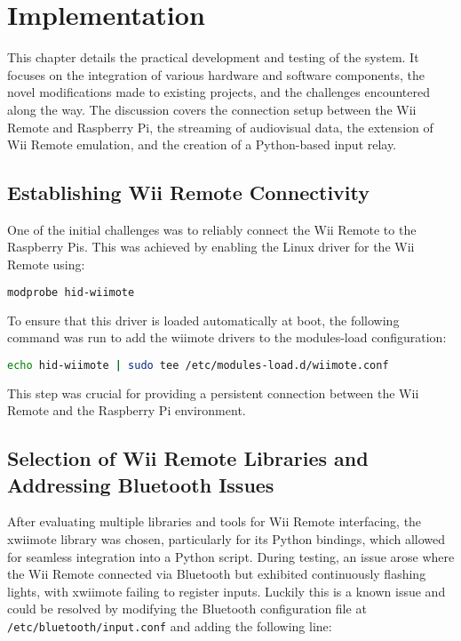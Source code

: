 \chapter{Implementation}
\label{chapter:implemntation}

This chapter details the practical development and testing of the system. It focuses on the integration of various hardware and software components, the novel modifications made to existing projects, and the challenges encountered along the way. The discussion covers the connection setup between the Wii Remote and Raspberry Pi, the streaming of audiovisual data, the extension of Wii Remote emulation, and the creation of a Python-based input relay.

\section{Establishing Wii Remote Connectivity}

One of the initial challenges was to reliably connect the Wii Remote to the Raspberry Pis. This was achieved by enabling the Linux driver for the Wii Remote using:

\begin{lstlisting}[language=bash]
modprobe hid-wiimote
\end{lstlisting}

To ensure that this driver is loaded automatically at boot, the following command was run to add the wiimote drivers to the modules-load configuration:

\begin{lstlisting}[language=bash]
echo hid-wiimote | sudo tee /etc/modules-load.d/wiimote.conf
\end{lstlisting}

This step was crucial for providing a persistent connection between the Wii Remote and the Raspberry Pi environment.

\section{Selection of Wii Remote Libraries and Addressing Bluetooth Issues}

After evaluating multiple libraries and tools for Wii Remote interfacing, the xwiimote\cite{xwiimote} library was chosen, particularly for its Python bindings\cite{xwiimote_bindings}, which allowed for seamless integration into a Python script. During testing, an issue arose where the Wii Remote connected via Bluetooth but exhibited continuously flashing lights, with xwiimote failing to register inputs. Luckily this is a known issue\cite{xwiimote_issue} and could be resolved by modifying the Bluetooth configuration file at \texttt{/etc/bluetooth/input.conf} and adding the following line:

